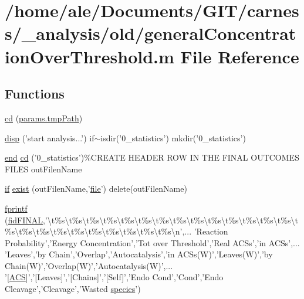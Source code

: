 \hypertarget{a00022}{\section{/home/ale/\-Documents/\-G\-I\-T/carness/\-\_\-analysis/old/general\-Concentration\-Over\-Threshold.m File Reference}
\label{a00022}
}
\subsection*{Functions}
\begin{DoxyCompactItemize}
\item 
\hyperlink{a00022_afb8c99b8f4d982428090b0b6ab07dafb}{cd} (\hyperlink{a00026_a1e5a4863ab2b87f923e1d19e2da1f5ac}{params.\-tmp\-Path})
\item 
\hyperlink{a00022_ae60321a34c0a93776384a837b8f3a9e1}{disp} ('start analysis...') if$\sim$isdir('0\-\_\-statistics') mkdir('0\-\_\-statistics')
\item 
\hyperlink{a00019_afb358f48b1646c750fb9da6c6585be2b}{end} \hyperlink{a00022_a442b9e123f36a16e7fca4f2f2f067c27}{cd} ('0\-\_\-statistics')\%\-C\-R\-E\-A\-T\-E H\-E\-A\-D\-E\-R R\-O\-W I\-N T\-H\-E F\-I\-N\-A\-L O\-U\-T\-C\-O\-M\-E\-S F\-I\-L\-E\-S out\-Filen\-Name
\item 
\hyperlink{a00024_a01d55766b8058903dd360b4bda71f9f5}{if} \hyperlink{a00022_a1e641c44546ec25e735b887393dceb16}{exist} (out\-Filen\-Name,'\hyperlink{a00062_a4e8353d6c62cf54bf4a1a8f63e56b8c3}{file}') delete(out\-Filen\-Name)
\item 
\hyperlink{a00022_a6ffb0f3cb73c8f8faf0b5192942de203}{fprintf} (\hyperlink{a00022_a2f1bf22f6a0c3f5791577061e92c0433}{fid\-F\-I\-N\-A\-L},'\textbackslash{}t\%s\textbackslash{}t\%s\textbackslash{}t\%s\textbackslash{}t\%s\textbackslash{}t\%s\textbackslash{}t\%s\textbackslash{}t\%s\textbackslash{}t\%s\textbackslash{}t\%s\textbackslash{}t\%s\textbackslash{}t\%s\textbackslash{}t\%s\textbackslash{}t\%s\textbackslash{}t\%s\textbackslash{}t\%s\textbackslash{}t\%s\textbackslash{}t\%s\textbackslash{}t\%s\textbackslash{}t\%s\textbackslash{}t\%s\textbackslash{}t\%s\textbackslash{}t\%s\textbackslash{}t\%s\textbackslash{}t\%s\textbackslash{}n',... 'Reaction Probability','Energy Concentration','Tot over Threshold','Real A\-C\-Ss','in A\-C\-Ss',... 'Leaves','by Chain','Overlap','Autocatalysis','in A\-C\-Ss(W)','Leaves(W)','by Chain(W)','Overlap(W)','Autocatalysis(W)',... '\mbox{[}\hyperlink{a00022_ad72e1068795c577213481e5db7f3e925}{A\-C\-S}\mbox{]}','\mbox{[}Leaves\mbox{]}','\mbox{[}Chains\mbox{]}','\mbox{[}Self\mbox{]}','Endo Cond','Cond','Endo Cleavage','Cleavage','Wasted \hyperlink{a00016}{species}')

\end{DoxyCompactItemize}
